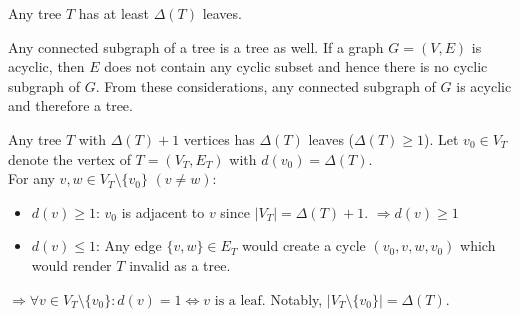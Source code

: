 \documentclass[a4paper]{article}
\begin{document}
	\begin{solution}{1}
		\begin{theorem}{Any tree $T$ has at least $\Delta(T)$ leaves.}
			\begin {lemma}{Any connected subgraph of a tree is a tree as well.}
				If a graph $G = (V, E)$ is acyclic, then $E$ does not contain any cyclic subset and hence there is no cyclic subgraph of $G$. From these considerations, any connected subgraph of $G$ is acyclic and therefore a tree.
			\end{lemma}
		
			\begin{lemma}{Any tree $T$ with $\Delta(T)+1$ vertices has $\Delta(T)$ leaves ($\Delta(T) \geq 1$).}
				Let $v_0 \in V_T$ denote the vertex of $T = (V_T, E_T)$ with $d(v_0) = \Delta(T)$.\\
				For any $v, w \in V_T\setminus\{v_0\}$ $(v \neq w)$:
				\begin{itemize}
					\item $d(v) \geq 1$: $v_0$ is adjacent to $v$ since $|V_T| =  \Delta(T)+1$. $\Rightarrow d(v) \geq 1$
					\item $d(v) \leq 1$: Any edge $\{v, w\} \in E_T$ would create a cycle $(v_0, v, w, v_0)$ which would render $T$ invalid as a tree.
				\end{itemize}
				$\Rightarrow \forall v \in V_T\setminus\{v_0\}: d(v) = 1 \Leftrightarrow v \text{ is a leaf}$. Notably, $|V_T\setminus\{v_0\}| = \Delta(T)$.
			\end{lemma}


\end{theorem}
\end{solution}
\end{document}
